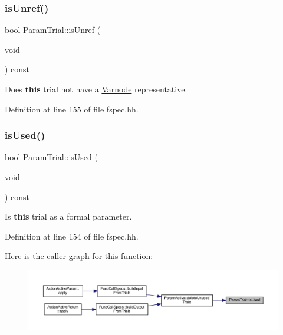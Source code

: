 \subsubsection{\texorpdfstring{isUnref()}{isUnref()}}
{\footnotesize\ttfamily bool Param\+Trial\+::is\+Unref (\begin{DoxyParamCaption}\item[{void}]{ }\end{DoxyParamCaption}) const\hspace{0.3cm}{\ttfamily [inline]}}



Does {\bfseries{this}} trial not have a \mbox{\hyperlink{class_varnode}{Varnode}} representative. 



Definition at line 155 of file fspec.\+hh.

\mbox{\label{class_param_trial_a77ad2e667e0525e2417845e389dcfa9f}} 
\subsubsection{\texorpdfstring{isUsed()}{isUsed()}}
{\footnotesize\ttfamily bool Param\+Trial\+::is\+Used (\begin{DoxyParamCaption}\item[{void}]{ }\end{DoxyParamCaption}) const\hspace{0.3cm}{\ttfamily [inline]}}



Is {\bfseries{this}} trial as a formal parameter. 



Definition at line 154 of file fspec.\+hh.

Here is the caller graph for this function\+:
\nopagebreak
\begin{figure}[H]
\begin{center}
\leavevmode
\includegraphics[width=350pt]{class_param_trial_a77ad2e667e0525e2417845e389dcfa9f_icgraph}
\end{center}
\end{figure}
\mbox{\label{class_param_trial_aa929e7464a8b48843ba7e03f7a741e0a}} 

